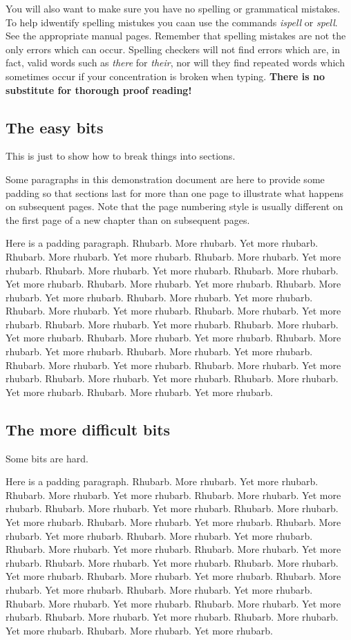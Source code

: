 \documentclass[12pt,a4paper]{article}
\begin{document}
You will also want to make sure you have no spelling or grammatical
mistakes. To help idwentify spelling mistukes you caan use the commands
{\em ispell} or {\em spell}. See the appropriate manual pages. Remember
that spelling mistakes are not the only errors which can occur. Spelling
checkers will not find errors which are, in fact, valid words such as
{\em there} for {\em their}, nor will they find repeated words which
sometimes occur if your concentration is broken when typing. {\bf There
is no substitute for thorough proof reading!}

\subsection{The easy bits}
This is just to show how to break things into sections.

Some paragraphs in this demonstration document are here to provide some
padding so that sections last for more than one page to illustrate what
happens on subsequent pages. Note that the page numbering style is usually
different on the first page of a new chapter than on subsequent pages.

Here is a padding paragraph.  Rhubarb.  More rhubarb.  Yet more rhubarb. 
Rhubarb.  More rhubarb.  Yet more rhubarb.  Rhubarb.  More rhubarb.  Yet
more rhubarb.  Rhubarb.  More rhubarb.  Yet more rhubarb.  Rhubarb. 
More rhubarb.  Yet more rhubarb.  Rhubarb.  More rhubarb.  Yet more
rhubarb.  Rhubarb.  More rhubarb.  Yet more rhubarb.  Rhubarb.  More
rhubarb.  Yet more rhubarb.  Rhubarb.  More rhubarb.  Yet more rhubarb. 
Rhubarb.  More rhubarb.  Yet more rhubarb.  Rhubarb.  More rhubarb.  Yet
more rhubarb.  Rhubarb.  More rhubarb.  Yet more rhubarb.  Rhubarb. 
More rhubarb.  Yet more rhubarb.  Rhubarb.  More rhubarb.  Yet more
rhubarb.  Rhubarb.  More rhubarb.  Yet more rhubarb.   Rhubarb.  More
rhubarb.  Yet more rhubarb.   Rhubarb.  More rhubarb.  Yet more
rhubarb.  Rhubarb.  More rhubarb.  Yet more rhubarb.    Rhubarb.  More
rhubarb.  Yet more rhubarb.  Rhubarb.  More rhubarb.  Yet more rhubarb. 

\subsection{The more difficult bits}
Some bits are hard.

Here is a padding paragraph.  Rhubarb.  More rhubarb.  Yet more rhubarb. 
Rhubarb.  More rhubarb.  Yet more rhubarb.  Rhubarb.  More rhubarb.  Yet
more rhubarb.  Rhubarb.  More rhubarb.  Yet more rhubarb.  Rhubarb. 
More rhubarb.  Yet more rhubarb.  Rhubarb.  More rhubarb.  Yet more
rhubarb.  Rhubarb.  More rhubarb.  Yet more rhubarb.  Rhubarb.  More
rhubarb.  Yet more rhubarb.  Rhubarb.  More rhubarb.  Yet more rhubarb. 
Rhubarb.  More rhubarb.  Yet more rhubarb.  Rhubarb.  More rhubarb.  Yet
more rhubarb.  Rhubarb.  More rhubarb.  Yet more rhubarb.  Rhubarb. 
More rhubarb.  Yet more rhubarb.  Rhubarb.  More rhubarb.  Yet more
rhubarb.  Rhubarb.  More rhubarb.  Yet more rhubarb.   Rhubarb.  More
rhubarb.  Yet more rhubarb.   Rhubarb.  More rhubarb.  Yet more
rhubarb.  Rhubarb.  More rhubarb.  Yet more rhubarb.    Rhubarb.  More
rhubarb.  Yet more rhubarb.  Rhubarb.  More rhubarb.  Yet more rhubarb. 
\end{document}
